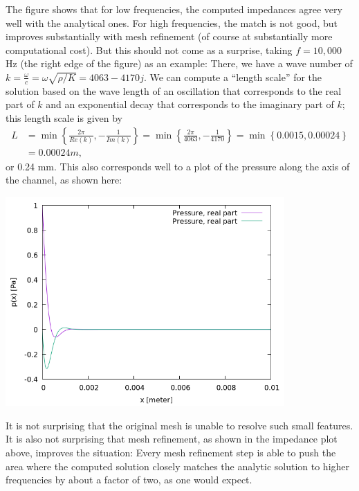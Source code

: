 \documentclass{article}
\begin{document}
The figure shows that for low frequencies, the computed impedances
agree very well with the analytical ones. For high frequencies, the
match is not good, but improves substantially with mesh refinement (of
course at substantially more computational cost). But this should not
come as a surprise, taking $f=10,000$ Hz (the right edge of the
figure) as an example: There, we have a wave number of
$k=\frac{\omega}{c}=\omega\sqrt{\rho/K}=4063-4170j$. We can compute a
``length scale'' for the solution based on the wave length of an
oscillation that corresponds to the real part of $k$ and an
exponential decay that corresponds to the imaginary part of $k$; this
length scale is given by
\begin{align*}
  L 
  &= \min\left\{ 
    \frac{2\pi}{Re(k)}, -\frac{1}{Im(k)}
  \right\}
  = \min\left\{ 
    \frac{2\pi}{4063}, -\frac{1}{4170}
  \right\}
  = \min\left\{ 
    0.0015, 0.00024
  \right\}
  \\
  &= 0.00024 m,  
\end{align*}
or 0.24 mm. This also corresponds well to a plot of the pressure along
the axis of the channel, as shown here:
\begin{center}
\includegraphics[width=0.8\textwidth]{wave-guide-tet-real-material-jasons-mesh-high-attenuation-0/solution-10kHz.png}
\end{center}
It is not surprising that the original mesh is unable to resolve such
small features. It is also not surprising that mesh refinement, as
shown in the impedance plot above, improves the situation: Every mesh
refinement step is able to push the area where the computed solution
closely matches the analytic solution to higher frequencies by about a
factor of two, as one would expect.
\end{document}
